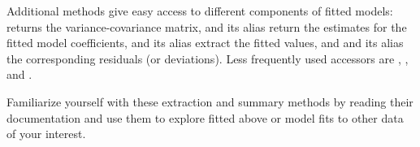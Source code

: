\documentclass[krantz2]{krantz}\usepackage{knitr}
\begin{document}
Additional methods give easy access to different components of fitted models:  returns the variance-covariance matrix,  and its alias  return the estimates for the fitted model coefficients,  and its alias  extract the fitted values, and  and its alias  the corresponding residuals (or deviations). Less frequently used accessors are , ,  and .

\begin{playground}
Familiarize yourself with these extraction and summary methods by reading their documentation and use them to explore  fitted above or model fits to other data of your interest.
\end{playground}
\end{document}
